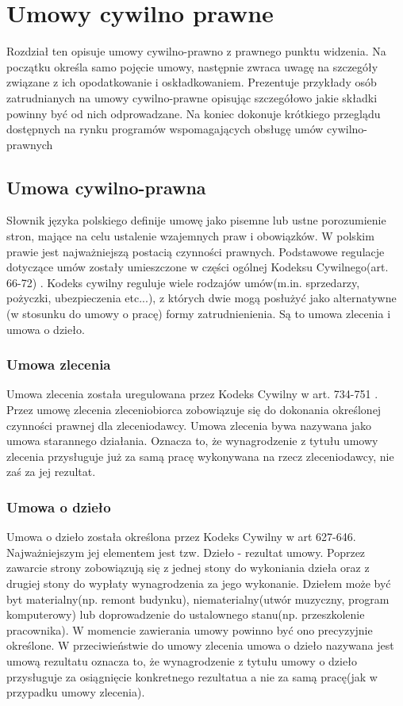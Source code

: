\chapter{Umowy cywilno prawne}
Rozdział ten opisuje umowy cywilno-prawno z prawnego punktu widzenia. Na początku określa samo pojęcie umowy, następnie zwraca uwagę na szczegóły związane z ich opodatkowanie i oskładkowaniem. Prezentuje przykłady osób zatrudnianych na umowy cywilno-prawne opisując szczegółowo jakie składki powinny być od nich odprowadzane. Na koniec dokonuje krótkiego przeglądu dostępnych na rynku programów wspomagających obsługę umów cywilno-prawnych

\section[Umowa cywilno-prawna][Umowa cywilno-prawna]{Umowa cywilno-prawna}
Słownik języka polskiego \cite{TODO} definije umowę jako pisemne lub ustne porozumienie stron, mające na celu ustalenie wzajemnych praw i obowiązków. W polskim prawie jest najważniejszą postacią czynności prawnych. Podstawowe regulacje dotyczące umów zostały umieszczone w części ogólnej Kodeksu Cywilnego(art. 66-72) \cite{TODO}. Kodeks cywilny reguluje wiele rodzajów umów(m.in. sprzedarzy, pożyczki, ubezpieczenia etc...), z których dwie mogą posłużyć jako alternatywne (w stosunku do umowy o pracę) formy zatrudnienienia. Są to umowa zlecenia i umowa o dzieło.

\subsection[Umowa zlecenia][Umowa zlecenia]{Umowa zlecenia}
Umowa zlecenia została uregulowana przez Kodeks Cywilny w art. 734-751 \cite{TODO}. Przez umowę zlecenia zleceniobiorca zobowiązuje się do dokonania określonej czynności prawnej dla zleceniodawcy. Umowa zlecenia bywa nazywana jako umowa starannego działania. Oznacza to, że wynagrodzenie z tytułu umowy zlecenia przysługuje już za samą pracę wykonywana na rzecz zleceniodawcy, nie zaś za jej rezultat.

\subsection[Umowa o dzieło][Umowa o dzieło]{Umowa o dzieło}
Umowa o dzieło została określona przez Kodeks Cywilny w art 627-646\cite{TODO}. Najważniejszym jej elementem jest tzw. Dzieło - rezultat umowy. Poprzez zawarcie strony zobowiązują się z jednej stony do wykoniania dzieła oraz z drugiej stony do wypłaty wynagrodzenia za jego wykonanie. Dziełem może być byt materialny(np. remont budynku), niematerialny(utwór muzyczny, program komputerowy) lub doprowadzenie do ustalownego stanu(np. przeszkolenie pracownika). W momencie zawierania umowy powinno być ono precyzyjnie określone. W przeciwieństwie do umowy zlecenia umowa o dzieło nazywana jest umową rezultatu oznacza to, że wynagrodzenie z tytułu umowy o dzieło przysługuje za osiągnięcie konkretnego rezultatua a nie za samą pracę(jak w przypadku umowy zlecenia).

